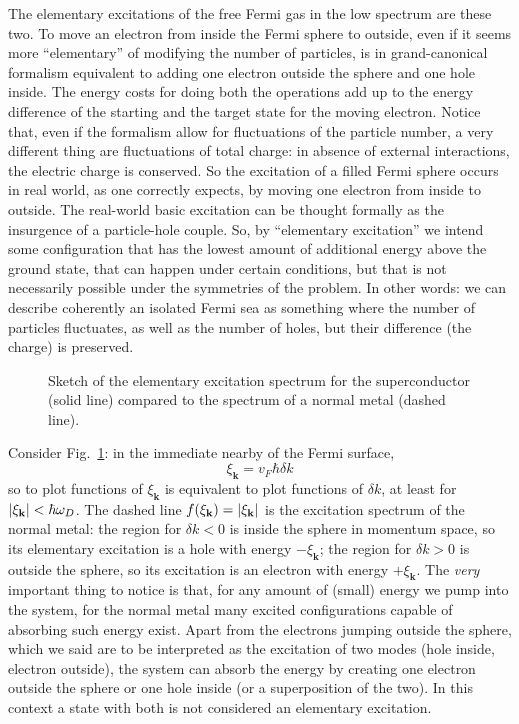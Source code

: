 The elementary excitations of the free Fermi gas in the low spectrum are these two. To move an electron from inside the Fermi sphere to outside, even if it seems more ``elementary'' of modifying the number of particles, is in grand-canonical formalism equivalent to adding one electron outside the sphere and one hole inside. The energy costs for doing both the operations add up to the energy difference of the starting and the target state for the moving electron. Notice that, even if the formalism allow for fluctuations of the particle number, a very different thing are fluctuations of total charge: in absence of external interactions, the electric charge is conserved. So the excitation of a filled Fermi sphere occurs in real world, as one correctly expects, by moving one electron from inside to outside. The real-world basic excitation can be thought formally as the insurgence of a particle-hole couple. So, by ``elementary excitation'' we intend some configuration that has the lowest amount of additional energy above the ground state, that can happen under certain conditions, but that is not necessarily possible under the symmetries of the problem. In other words: we can describe coherently an isolated Fermi sea as something where the number of particles fluctuates, as well as the number of holes, but their difference (the charge) is preserved.

\begin{figure}
	\centering
	
	\caption{Sketch of the elementary excitation spectrum for the superconductor (solid line) compared to the spectrum of a normal metal (dashed line).}
	\label{fig:excitation spectrum}
\end{figure}

Consider Fig.~\ref{fig:excitation spectrum}: in the immediate nearby of the Fermi surface,
\[
	\xi_\mathbf{k} = v_F \hbar \delta k
\]
so to plot functions of $\xi_{\mathbf{k}}$ is equivalent to plot functions of $\delta k$, at least for $\abs{\xi_\mathbf{k}} < \hbar\omega_D$. The dashed line $f(\xi_{\mathbf{k}}) = \abs{\xi_{\mathbf{k}}}$ is the excitation spectrum of the normal metal: the region for $\delta k < 0$ is inside the sphere in momentum space, so its elementary excitation is a hole with energy $-\xi_{\mathbf{k}}$; the region for $\delta k > 0$ is outside the sphere, so its excitation is an electron with energy $+\xi_{\mathbf{k}}$. The \textit{very} important thing to notice is that, for any amount of (small) energy we pump into the system, for the normal metal many excited configurations capable of absorbing such energy exist. Apart from the electrons jumping outside the sphere, which we said are to be interpreted as the excitation of two modes (hole inside, electron outside), the system can absorb the energy by creating one electron outside the sphere or one hole inside (or a superposition of the two). In this context a state with both is not considered an elementary excitation.

